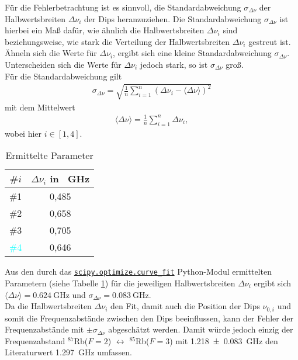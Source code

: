 \noindent Für die Fehlerbetrachtung ist es sinnvoll, die Standardabweichung $\sigma_{\Delta \nu}$ der Halbwertsbreiten $\Delta \nu_{i}$ der Dips heranzuziehen. Die Standardabweichung $\sigma_{\Delta \nu}$ ist hierbei ein Maß dafür, wie ähnlich die Halbwertsbreiten $\Delta \nu_{i}$ sind beziehungsweise, wie stark die Verteilung der Halbwertsbreiten $\Delta \nu_{i}$ gestreut ist. Ähneln sich die Werte für $\Delta \nu_{i}$, ergibt sich eine kleine Standardabweichung $\sigma_{\Delta \nu}$. Unterscheiden sich die Werte für $\Delta \nu_{i}$ jedoch stark, so ist $\sigma_{\Delta \nu}$ groß. \\
Für die Standardabweichung gilt 
\begin{align}
    \sigma_{\Delta \nu} = \sqrt{\frac{1}{n} \sum_{i = 1}^{n} (\Delta \nu_{i} - \langle \Delta \nu \rangle)^2} 
    \label{eq:standard-dev}
\end{align}
mit dem Mittelwert 
\begin{align}
    \langle \Delta \nu \rangle = \frac{1}{n} \sum_{i = 1}^{n} \Delta \nu_{i},
    \label{eq:mean}
\end{align}
wobei hier $i \in [1,4]$.

\begin{table}[!h]
    \centering
    \begin{tabular}{|c|c|}
        \hline 
        \#$i$ & $\Delta \nu_{i}$ in \SI{}{\giga \hertz} \\
        \hline
        \hline 
         \textcolor{red!80!black}{\#1} & 0,485 \\
        \hline 
         \textcolor{green!50!black}{\#2} & 0,658 \\
        \hline 
         \textcolor{pink!50!purple}{\#3} & 0,705 \\
        \hline
         \textcolor{cyan}{\#4} & 0,646 \\
        \hline
    \end{tabular}
    \caption{Ermittelte Parameter}
    \label{tab:delta_nu_parameter}
\end{table}

\noindent Aus den durch das \href{https://docs.scipy.org/doc/scipy/reference/generated/scipy.optimize.curve_fit.html}{\texttt{scipy.optimize.curve_fit}} Python-Modul ermittelten Parametern (siehe Tabelle \ref{tab:delta_nu_parameter}) für die jeweiligen Halbwertsbreiten $\Delta \nu_{i}$  ergibt sich $\langle \Delta \nu \rangle = \SI{0,624}{\giga \hertz}$ und $\sigma_{\Delta \nu} = \SI{0.083}{\giga \hertz}$. \\
Da die Halbwertsbreiten $\Delta \nu_{i}$ den Fit, damit auch die Position der Dips $\nu_{0,i}$ und somit die Frequenzabstände zwischen den Dips beeinflussen, kann der Fehler der Frequenzabstände mit $\pm \sigma_{\Delta \nu}$ abgeschätzt werden.
Damit würde jedoch einzig der Frequenzabstand $^{87}$Rb($F = 2$) $\longleftrightarrow$ $^{85}$Rb($F = 3$) mit \SI{1,218 \pm 0,083}{\giga \hertz} den Literaturwert \SI{1,297}{\giga \hertz} umfassen. \\ 

